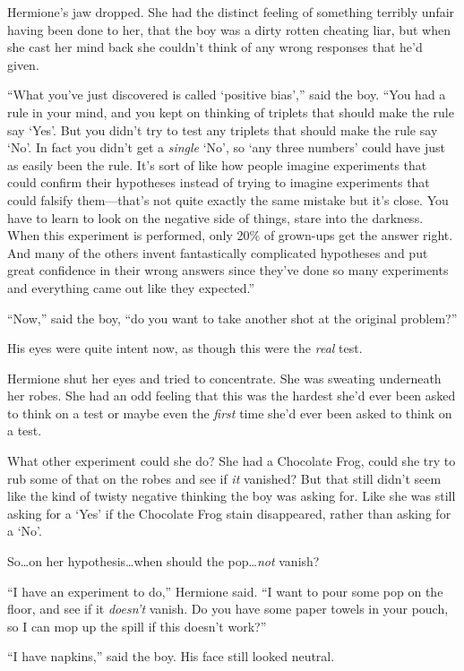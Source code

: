 Hermione’s jaw dropped. She had the distinct feeling of something terribly unfair having been done to her, that the boy was a dirty rotten cheating liar, but when she cast her mind back she couldn’t think of any wrong responses that he’d given.

“What you’ve just discovered is called ‘positive bias’,” said the boy. “You had a rule in your mind, and you kept on thinking of triplets that should make the rule say ‘Yes’. But you didn’t try to test any triplets that should make the rule say ‘No’. In fact you didn’t get a \emph{single} ‘No’, so ‘any three numbers’ could have just as easily been the rule. It’s sort of like how people imagine experiments that could confirm their hypotheses instead of trying to imagine experiments that could falsify them—that’s not quite exactly the same mistake but it’s close. You have to learn to look on the negative side of things, stare into the darkness. When this experiment is performed, only 20\% of grown-ups get the answer right. And many of the others invent fantastically complicated hypotheses and put great confidence in their wrong answers since they’ve done so many experiments and everything came out like they expected.”

“Now,” said the boy, “do you want to take another shot at the original problem?”

His eyes were quite intent now, as though this were the \emph{real} test.

Hermione shut her eyes and tried to concentrate. She was sweating underneath her robes. She had an odd feeling that this was the hardest she’d ever been asked to think on a test or maybe even the \emph{first} time she’d ever been asked to think on a test.

What other experiment could she do? She had a Chocolate Frog, could she try to rub some of that on the robes and see if \emph{it} vanished? But that still didn’t seem like the kind of twisty negative thinking the boy was asking for. Like she was still asking for a ‘Yes’ if the Chocolate Frog stain disappeared, rather than asking for a ‘No’.

So…on her hypothesis…when should the pop…\emph{not}
vanish?

“I have an experiment to do,” Hermione said. “I want to pour some pop on the floor, and see if it \emph{doesn’t} vanish. Do you have some paper towels in your pouch, so I can mop up the spill if this doesn’t work?”

“I have napkins,” said the boy. His face still looked neutral.

